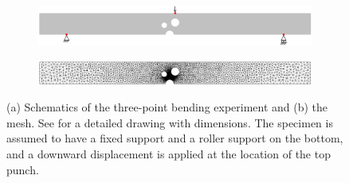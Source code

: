 \begin{figure}[!htb]
  \centering
  \begin{subfigure}[b]{0.9\textwidth}
    \centering
    \includegraphics[width=\textwidth,scale=0.5]{Chapter5/figures/3pb/3pb_bc}
    \caption{}
  \end{subfigure}
  \begin{subfigure}[b]{0.9\textwidth}
    \centering
    \includegraphics[width=\textwidth,scale=0.5]{Chapter5/figures/3pb/3pb_mesh}
    \caption{}
    \label{fig: Chapter5/3pb/3pb_mesh}
  \end{subfigure}
  \caption[Schematics of the three-point bending experiment and the mesh.]{(a) Schematics of the three-point bending experiment and (b) the mesh. See \cite{kubik2019ductile} for a detailed drawing with dimensions. The specimen is assumed to have a fixed support and a roller support on the bottom, and a downward displacement is applied at the location of the top punch.}
  \label{fig: Chapter5/3pb/3pb}
\end{figure}
